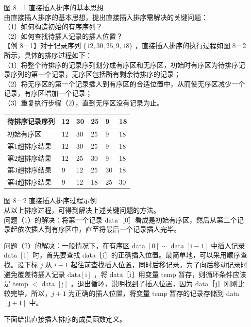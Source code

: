 \documentclass[10pt]{article}
\begin{document}
图 8－1 直接插人排序的基本思想\\
由直接插人排序的基本思想，提出直接插入排序需解决的关键问题：\\
（1）如何构造初始的有序序列？\\
（2）如何查找待插人记录的插人位置？\\
【例 8－1】对于记录序列 $\{12,30,25,9,18\}$ ，直接插人排序的执行过程如图 8－2 所示，具体的排序过程如下：\\
（1）将整个待排序的记录序列划分成有序区和无序区，初始时有序区为待排序记录序列的第一个记录，无序区包括所有剩余待排序的记录；\\
（2）将无序区的第一个记录插人到有序区的合适位置中，从而使无序区减少一个记录，有序区增加一个记录；\\
（3）重复执行步骤（2），直到无序区没有记录为止。

\begin{center}
\begin{tabular}{|l|l|l|l|l|l|}
\hline
待排序记录序列 & 12 & 30 & 25 & 9 & 18 \\
\hline
初始有序区 & 12 & 30 & 25 & 9 & 18 \\
\hline
第1趟排序结果 & 12 & 30 & 25 & 9 & 18 \\
\hline
第2趟排序结果 & 12 & 25 & 30 & 9 & 18 \\
\hline
第3趟排序结果 & 9 & 12 & 25 & 30 & 18 \\
\hline
第4趙排序结果 & 9 & 12 & 18 & 25 & 30 \\
\hline
\end{tabular}
\end{center}

图 8－2 直接插人排序过程示例\\
从以上排序过程，可得到解决上述关键问题的方法。\\
问题（1）的解决：将第一个记录 data［0］看成是初始有序区，然后从第二个记录起依次插人到有序区中，直至将最后一个记录插人完毕。

问题（2）的解决：一般情况下，在有序区 data $[0] \sim \operatorname{data}[\mathrm{i}-1]$ 中插人记录 data $[\mathrm{i}]$ 时，首先要查找 data［i］的正确插入位置。最简单地，可以采用顺序查找。设下标 $j$ 从 $i-1$ 起往前查找插人位置，同时后移记录，为了向后移动记录时避免覆盖待插人记录 $\mathrm{data}[\mathrm{i}]$ ，将 data［i］用变量 temp 暂存，则循环条件应该是 temp $<$ data $[\mathrm{j}]$ 。退出循环，说明找到了插人位置，因为 data［j］刚刚比较完毕，所以，$j+1$ 为正确的插人位置，将变量 temp 暂存的记录存储到 data $[\mathrm{j}+1]$ 中。

下面给出直接插人排序的成员函数定义。
\end{document}
